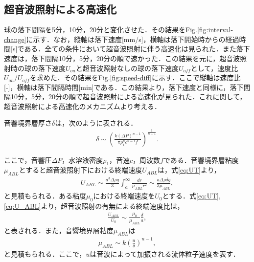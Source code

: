 \clearpage

\subsection{超音波照射による高速化}

球の落下間隔を5分，10分，20分と変化させた．その結果をFig.\ref{fig:interval-change}に示す．なお，縦軸は落下速度[mm/s]，横軸は落下開始時からの経過時間[s]である．全ての条件において超音波照射に伴う高速化は見られた．また落下速度は，落下間隔10分，5分，20分の順で速かった．この結果を元に，超音波照射時の球の落下速度$U_{on}$と超音波照射なしの球の落下速度$U_{off}$として，速度比$U_{on}/U_{off}$を求めた．その結果をFig.\ref{fig:speed-diff}に示す．ここで縦軸は速度比[-]，横軸は落下間隔時間[min]である．この結果より，落下速度と同様に，落下間隔10分，5分，20分の順で超音波照射による高速化が見られた．これに関して，超音波照射による高速化のメカニズムより考える．

音響境界層厚さ$\delta$は，次のように表される．
\begin{eqnarray}
    \delta \sim \left(\frac{k\left(\Delta P\right)^{n-1}}{\pi \rho^n_1 c^{n-1} f}\right)^{\frac{1}{n+1}} .
    \label{eq:delta}
\end{eqnarray}

ここで，音響圧$\Delta P$，水溶液密度$\rho_1$，音速$c$，周波数$f$である．音響境界層粘度$\mu_{ABL}$とすると超音波照射下における終端速度$U_{ABL}$は，式\ref{eq:UT}より，
\begin{eqnarray}
    U_{ABL} \sim \frac{a^3\Delta\rho g}{3}  \int^{\infty}_{a} \frac{dr}{\mu_{ABL} r^2} \sim \frac{a\Delta \rho \delta g}{3\mu_{ABL}} ,
    \label{eq:U_ABL}
\end{eqnarray}
と見積もられる．ある粘度$\mu_0$における終端速度を$U_0$とする．式\ref{eq:UT},\ref{eq:U_ABL}より，超音波照射の有無による終端速度比は，
\begin{eqnarray}
    \frac{U_{ABL}}{U_0} \sim \frac{\mu_0}{\mu_{ABL}}\frac{\delta}{a} ,
    \label{eq:Udiff}
\end{eqnarray}
と表される．また，音響境界層粘度$\mu_{ABL}$は
\begin{eqnarray}
    \mu_{ABL} \sim k\left(\frac{u}{\delta}\right)^{n-1} ,
    \label{eq:muABL}
\end{eqnarray}
と見積もられる．ここで，$u$は音波によって加振される流体粒子速度を表す．

